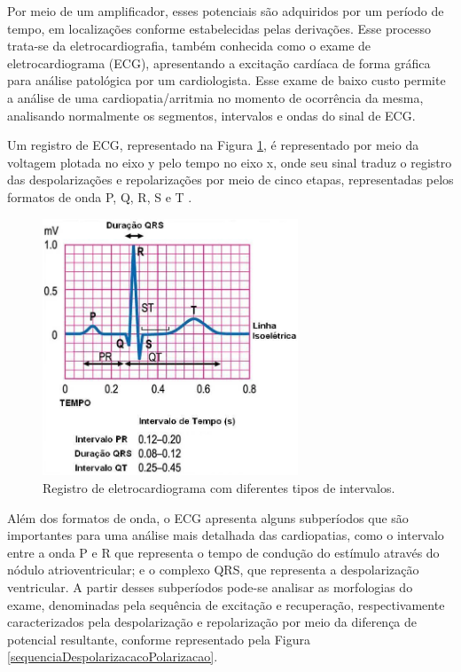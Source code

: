 \documentclass[conference]{IEEEtran}
\begin{document}
Por meio de um amplificador, esses potenciais são adquiridos por um período de tempo, em localizações conforme estabelecidas pelas derivações. Esse processo trata-se da eletrocardiografia, também conhecida como o exame de eletrocardiograma (ECG), apresentando a excitação cardíaca de forma gráfica para análise patológica por um cardiologista. Esse exame de baixo custo permite a análise de uma cardiopatia/arritmia no momento de ocorrência da mesma, analisando normalmente os segmentos, intervalos e ondas do sinal de ECG.

Um registro de ECG, representado na Figura \ref{eletrocardiogramaIntervalos}, é representado por meio da voltagem plotada no eixo y pelo tempo no eixo x, onde seu sinal traduz o registro das despolarizações e repolarizações por meio de cinco etapas, representadas pelos formatos de onda P, Q, R, S e T \cite{mello91}.

\begin{figure}[!h]
	\centering
	\includegraphics[width=3in]{img/eletrocardiogramaIntervalos}
	\caption{Registro de eletrocardiograma com diferentes tipos de intervalos.}
	\label{eletrocardiogramaIntervalos}
\end{figure}

Além dos formatos de onda, o ECG apresenta alguns subperíodos que são importantes para uma análise mais detalhada das cardiopatias, como o intervalo entre a onda P e R que representa o tempo de condução do estímulo através do nódulo atrioventricular; e o complexo QRS, que representa a despolarização ventricular. A partir desses subperíodos pode-se analisar as morfologias do exame, denominadas pela sequência de excitação e recuperação, respectivamente caracterizados pela despolarização e repolarização por meio da
diferença de potencial resultante, conforme representado pela Figura \ref{sequenciaDespolarizacacoPolarizacao}.
\end{document}

